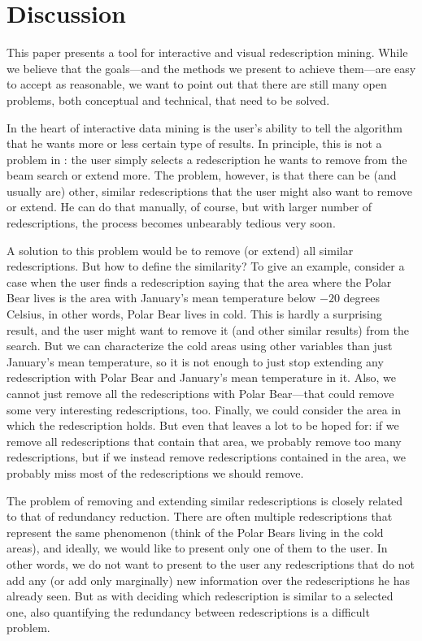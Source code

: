 \section{Discussion}

This paper presents a tool for interactive and visual redescription
mining. While we believe that the goals---and the methods we present
to achieve them---are easy to accept as reasonable, we want to point
out that there are still many open problems, both conceptual and
technical, that need to be solved. 

In the heart of interactive data mining is the user's ability to tell
the algorithm that he wants more or less certain type of results. In
principle, this is not a problem in \Siren: the user simply selects a
redescription he wants to remove from the beam search or extend
more. The problem, however, is that there can be (and usually are)
other, similar redescriptions that the user might also want to remove
or extend. He can do that manually, of course, but with larger number
of redescriptions, the process becomes unbearably tedious very soon.

A solution to this problem would be to remove (or extend) all similar
redescriptions. But how to define the similarity? To give an example,
consider a case when the user finds a redescription saying that the
area where the Polar Bear lives is the area with January's mean
temperature below $-20$ degrees Celsius, in other words, Polar Bear
lives in cold. This is hardly a surprising result, and the user might
want to remove it (and other similar results) from the search. But we
can characterize the cold areas using other variables than just
January's mean temperature, so it is not enough to just stop extending
any redescription with Polar Bear and January's mean temperature in
it. Also, we cannot just remove all the redescriptions with Polar
Bear---that could remove some very interesting redescriptions,
too. Finally, we could consider the area in which the redescription
holds. But even that leaves a lot to be hoped for: if we remove all
redescriptions that contain that area, we probably remove too many
redescriptions, but if we instead remove redescriptions
 contained in the area, we probably miss most of the
redescriptions we should remove.  

The problem of removing and extending similar redescriptions is
closely related to that of redundancy reduction. There are often
multiple redescriptions that represent the same phenomenon (think of
the Polar Bears living in the cold areas), and ideally, we would like
to present only one of them to the user. In other words, we do not want
to present to the user any redescriptions that do not add any (or add
only marginally) new information over the redescriptions he has
already seen. But as with deciding which redescription is similar to a
selected one, also quantifying the redundancy between redescriptions
is a difficult problem.

